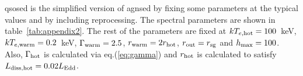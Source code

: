\documentclass[a4paper,fleqn,usenatbib]{mnras}
\begin{document}
{\sc qsosed} is the simplified version of {\sc agnsed} by fixing some parameters at the typical values and by including reprocessing.
The spectral parameters are shown in table~\ref{tab:appendix2}. 
The rest of the parameters are fixed at $kT_{e, {\rm hot}}=100$~keV,  $kT_{e, {\rm warm}}=0.2$~keV, $\Gamma_{\rm warm}=2.5$, $r_{\rm warm}=2r_{\rm hot}$, $r_{\rm out}=r_{\rm sg}$ and $h_{\rm max}=100$. 
Also, $\Gamma_{\rm hot}$ is calculated via eq.(\ref{eq:gamma}) and $r_{\rm hot}$ is calculated to satisfy $L_{\rm diss,hot}=0.02L_{\rm Edd}$. 

\end{document}
